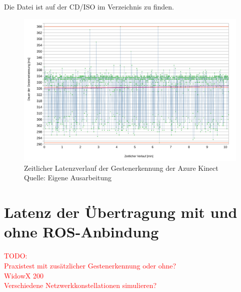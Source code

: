 Die Datei  ist auf der CD/ISO im Verzeichnis  zu finden.

\begin{figure}[htb]
	\centering
	\includegraphics[width=1.04\textwidth]{images/ergebnisse/dauer_der_gestenerkennung_verlauf}
	\caption[Zeitlicher Latenzverlauf der Gestenerkennung der Azure Kinect]{Zeitlicher Latenzverlauf der Gestenerkennung der Azure Kinect\\Quelle: Eigene Ausarbeitung}
	\label{fig:measurement_gesture_recognition_azure_kinect}
\end{figure}
\FloatBarrier


\section{Latenz der Übertragung mit und ohne ROS-Anbindung}
\textcolor{red}{TODO:\\
Praxistest mit zusätzlicher Gestenerkennung oder ohne?\\
WidowX 200\\
Verschiedene Netzwerkkonstellationen simulieren? %
}


